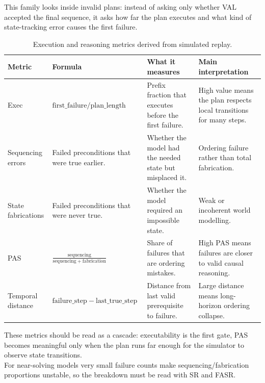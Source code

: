 This family looks inside invalid plans: instead of asking only whether VAL accepted the final sequence, it asks how far the plan executes and what kind of state-tracking error causes the first failure.

\begin{table}[H]\small
\centering
\begin{tabularx}{\linewidth}{@{}l l Y Y@{}}
\toprule
\textbf{Metric} & \textbf{Formula} & \textbf{What it measures} & \textbf{Main interpretation}\\
\midrule
Exec & \(\mathrm{first\_failure}/\mathrm{plan\_length}\) & Prefix fraction that executes before the first failure. & High value means the plan respects local transitions for many steps.\\
\addlinespace
Sequencing errors & Failed preconditions that were true earlier. & Whether the model had the needed state but misplaced it. & Ordering failure rather than total fabrication.\\
\addlinespace
State fabrications & Failed preconditions that were never true. & Whether the model required an impossible state. & Weak or incoherent world modelling.\\
\addlinespace
PAS & \(\frac{\mathrm{sequencing}}{\mathrm{sequencing}+\mathrm{fabrication}}\) & Share of failures that are ordering mistakes. & High PAS means failures are closer to valid causal reasoning.\\
\addlinespace
Temporal distance & \(\mathrm{failure\_step}-\mathrm{last\_true\_step}\) & Distance from last valid prerequisite to failure. & Large distance means long-horizon ordering collapse.\\
\bottomrule
\end{tabularx}
\caption{Execution and reasoning metrics derived from simulated replay.}
\label{tab:execution-metrics-compact}
\end{table}

These metrics should be read as a cascade: executability is the first gate, PAS becomes meaningful only when the plan runs far enough for the simulator to observe state transitions.\\
For near-solving models very small failure counts make sequencing/fabrication proportions unstable, so the breakdown must be read with SR and FASR.